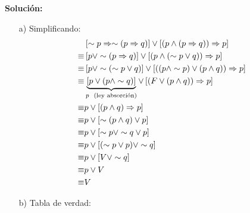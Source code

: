 \documentclass[a4paper,10pt]{article}
\begin{document}
\textbf{Solución:}

    \begin{enumerate}
        \item[a)] Simplificando:
            \begin{align*}
                       & \left[ \sim p \Rightarrow \sim (p \Rightarrow q)\right] \vee \left[ \left(p \wedge (p \Rightarrow q)\right) \Rightarrow p \right] \\
                \equiv & \left[  p \vee \sim (p \Rightarrow q)\right] \vee \left[ \left(p \wedge (\sim p \vee q)\right) \Rightarrow p \right] \\
                \equiv & \left[  p \vee \sim (\sim p \vee q)\right] \vee \left[ \left((p \wedge \sim p )  \vee (p \wedge q)\right) \Rightarrow p \right] \\
                \equiv & \underbrace{\left[  p \vee ( p \wedge \sim q)\right]}_{p \hspace{2mm}\text{(ley absorción)}} \vee \left[ \left( F  \vee (p \wedge q)\right) \Rightarrow p \right] \\
                \equiv & p \vee \left[ \left(p \wedge q\right) \Rightarrow p \right] \\
                \equiv &p \vee \left[ \sim \left(p \wedge q\right) \vee p \right] \\
                \equiv &p \vee \left[ \sim p \vee \sim q \vee  p \right] \\
                \equiv &p \vee \left[ (\sim p \vee  p) \vee \sim q  \right] \\
                \equiv &p \vee \left[ V \vee \sim q  \right] \\
                \equiv &p \vee V \\
                \equiv & V
            \end{align*}
            \newpage



        \item[b)] Tabla de verdad:


\end{enumerate}
\end{document}
